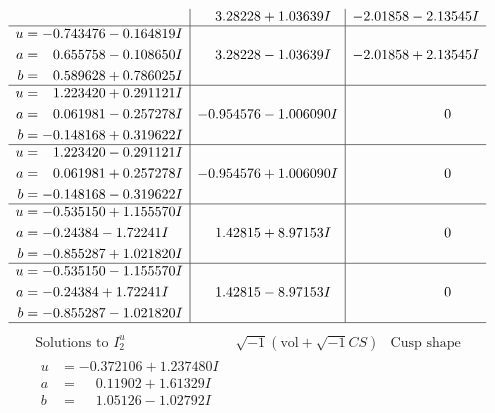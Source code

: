 \documentclass[1p]{elsarticle_modified}
\theoremstyle{definition}
\newcommand{\I}{\sqrt{-1}}
\begin{document}
$$\begin{array}{c|c|c}
 & \phantom{-}3.28228 + 1.03639 I & -2.01858 - 2.13545 I \\ \hline\begin{aligned}
u &= -0.743476 - 0.164819 I \\
a &= \phantom{-}0.655758 - 0.108650 I \\
b &= \phantom{-}0.589628 + 0.786025 I\end{aligned}
 & \phantom{-}3.28228 - 1.03639 I & -2.01858 + 2.13545 I \\ \hline\begin{aligned}
u &= \phantom{-}1.223420 + 0.291121 I \\
a &= \phantom{-}0.061981 - 0.257278 I \\
b &= -0.148168 + 0.319622 I\end{aligned}
 & -0.954576 - 1.006090 I & \phantom{-0.000000 } 0 \\ \hline\begin{aligned}
u &= \phantom{-}1.223420 - 0.291121 I \\
a &= \phantom{-}0.061981 + 0.257278 I \\
b &= -0.148168 - 0.319622 I\end{aligned}
 & -0.954576 + 1.006090 I & \phantom{-0.000000 } 0 \\ \hline\begin{aligned}
u &= -0.535150 + 1.155570 I \\
a &= -0.24384 - 1.72241 I \\
b &= -0.855287 + 1.021820 I\end{aligned}
 & \phantom{-}1.42815 + 8.97153 I & \phantom{-0.000000 } 0 \\ \hline\begin{aligned}
u &= -0.535150 - 1.155570 I \\
a &= -0.24384 + 1.72241 I \\
b &= -0.855287 - 1.021820 I\end{aligned}
 & \phantom{-}1.42815 - 8.97153 I & \phantom{-0.000000 } 0\\
 \hline 
 \end{array}$$\newpage$$\begin{array}{c|c|c}  
\text{Solutions to }I^u_{2}& \I (\text{vol} + \sqrt{-1}CS) & \text{Cusp shape}\\
 \hline 
\begin{aligned}
u &= -0.372106 + 1.237480 I \\
a &= \phantom{-}0.11902 + 1.61329 I \\
b &= \phantom{-}1.05126 - 1.02792 I\end{aligned}

\end{array}$$
\end{document}
